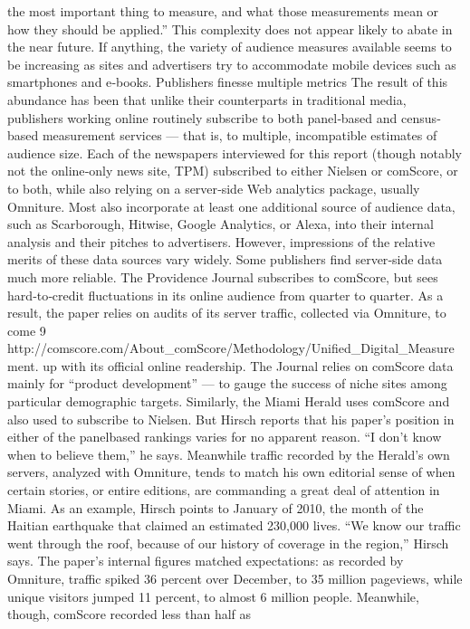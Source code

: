the most important thing to measure, and what those measurements mean
or how they should be applied.''
This complexity does not appear likely to abate in the near future. If
anything, the variety of audience measures available seems to be
increasing as sites and advertisers try to accommodate mobile devices
such as smartphones and e‐books.
Publishers finesse multiple metrics
The result of this abundance has been that unlike their counterparts in
traditional media, publishers working online routinely subscribe to both
panel‐based and census‐based measurement services — that is, to
multiple, incompatible estimates of audience size. Each of the newspapers
interviewed for this report (though notably not the online‐only news site,
TPM) subscribed to either Nielsen or comScore, or to both, while also
relying on a server‐side Web analytics package, usually Omniture. Most
also incorporate at least one additional source of audience data, such as
Scarborough, Hitwise, Google Analytics, or Alexa, into their internal
analysis and their pitches to advertisers.
However, impressions of the relative merits of these data sources vary
widely. Some publishers find server‐side data much more reliable. The
Providence Journal subscribes to comScore, but sees hard‐to‐credit
fluctuations in its online audience from quarter to quarter. As a result, the
paper relies on audits of its server traffic, collected via Omniture, to come
9 http://comscore.com/About_comScore/Methodology/Unified_Digital_Measurement.
up with its official online readership. The Journal relies on comScore data
mainly for ``product development'' — to gauge the success of niche sites
among particular demographic targets.
Similarly, the Miami Herald uses comScore and also used to subscribe to
Nielsen. But Hirsch reports that his paper’s position in either of the panelbased
rankings varies for no apparent reason. ``I don’t know when to
believe them,'' he says. Meanwhile traffic recorded by the Herald’s own
servers, analyzed with Omniture, tends to match his own editorial sense
of when certain stories, or entire editions, are commanding a great deal of
attention in Miami.
As an example, Hirsch points to January of 2010, the month of the Haitian
earthquake that claimed an estimated 230,000 lives. ``We know our traffic
went through the roof, because of our history of coverage in the region,''
Hirsch says. The paper’s internal figures matched expectations: as
recorded by Omniture, traffic spiked 36 percent over December, to 35
million pageviews, while unique visitors jumped 11 percent, to almost 6
million people. Meanwhile, though, comScore recorded less than half as
